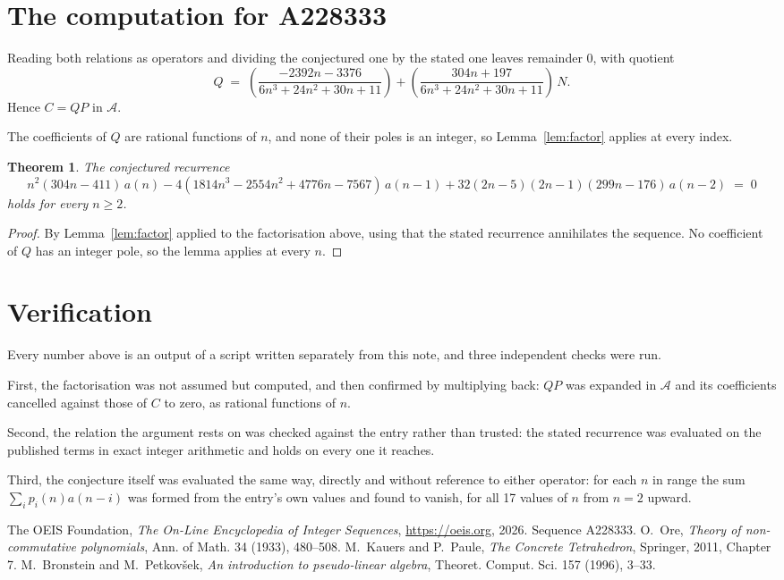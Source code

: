 \documentclass[11pt,a4paper]{article}
\theoremstyle{plain}
\newtheorem{theorem}{Theorem}
\theoremstyle{definition}
\begin{document}
\section{The computation for A228333}

Reading both relations as operators and dividing the conjectured one by the stated one
leaves remainder $0$, with quotient
\[
Q \;=\; \left(\frac{- 2392 n - 3376}{6 n^{3} + 24 n^{2} + 30 n + 11}\right) + \left(\frac{304 n + 197}{6 n^{3} + 24 n^{2} + 30 n + 11}\right)\,N .
\]
Hence $C=QP$ in $\mathcal{A}$.

The coefficients of $Q$ are rational functions of $n$, and none of their poles is an integer, so Lemma~\ref{lem:factor} applies at every index.

\begin{theorem}
The conjectured recurrence
\[
n^{2} \left(304 n - 411\right)\,a(n) -  4 \left(1814 n^{3} - 2554 n^{2} + 4776 n - 7567\right)\,a(n-1) + 32 \left(2 n - 5\right) \left(2 n - 1\right) \left(299 n - 176\right)\,a(n-2) \;=\;0
\]
holds for every $n\ge2$.
\end{theorem}

\begin{proof}
By Lemma~\ref{lem:factor} applied to the factorisation above, using that the stated
recurrence annihilates the sequence. No coefficient of $Q$ has an integer pole, so the lemma applies at every $n$.
\end{proof}

\section{Verification}

Every number above is an output of a script written separately from this note, and three
independent checks were run.

First, the factorisation was not assumed but computed, and then confirmed by multiplying
back: $QP$ was expanded in $\mathcal{A}$ and its coefficients cancelled against those of
$C$ to zero, as rational functions of $n$.

Second, the relation the argument rests on was checked against the entry rather than
trusted: the stated recurrence was evaluated on the published terms in exact integer
arithmetic and holds on every one it reaches.

Third, the conjecture itself was evaluated the same way, directly and without reference to
either operator: for each $n$ in range the sum $\sum_{i}p_{i}(n)a(n-i)$ was formed from the
entry's own values and found to vanish, for all 17 values of $n$ from
$n=2$ upward.

\begin{thebibliography}{9}
 The OEIS Foundation, \emph{The On-Line Encyclopedia of Integer Sequences},
\url{https://oeis.org}, 2026. Sequence A228333.
 O.~Ore, \emph{Theory of non-commutative polynomials}, Ann. of Math. 34
(1933), 480--508.
 M.~Kauers and P.~Paule, \emph{The Concrete Tetrahedron}, Springer, 2011,
Chapter 7.
 M.~Bronstein and M.~Petkov\v{s}ek, \emph{An introduction to
pseudo-linear algebra}, Theoret. Comput. Sci. 157 (1996), 3--33.
\end{thebibliography}
\end{document}
